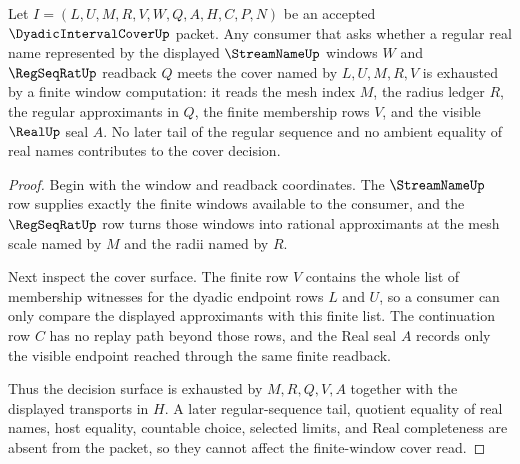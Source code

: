 \begin{theorem}
\label{thm:dyadic-interval-cover-regular-sequence-window-exhaustion}
Let $I=(L,U,M,R,V,W,Q,A,H,C,P,N)$ be an accepted $\DyadicIntervalCoverUp$ packet. Any consumer that asks whether a regular real name represented by the displayed $\StreamNameUp$ windows $W$ and $\RegSeqRatUp$ readback $Q$ meets the cover named by $L,U,M,R,V$ is exhausted by a finite window computation: it reads the mesh index $M$, the radius ledger $R$, the regular approximants in $Q$, the finite membership rows $V$, and the visible $\RealUp$ seal $A$. No later tail of the regular sequence and no ambient equality of real names contributes to the cover decision.
\end{theorem}
\begin{proof}
Begin with the window and readback coordinates. The $\StreamNameUp$ row supplies exactly the finite windows available to the consumer, and the $\RegSeqRatUp$ row turns those windows into rational approximants at the mesh scale named by $M$ and the radii named by $R$.

Next inspect the cover surface. The finite row $V$ contains the whole list of membership witnesses for the dyadic endpoint rows $L$ and $U$, so a consumer can only compare the displayed approximants with this finite list. The continuation row $C$ has no replay path beyond those rows, and the Real seal $A$ records only the visible endpoint reached through the same finite readback.

Thus the decision surface is exhausted by $M,R,Q,V,A$ together with the displayed transports in $H$. A later regular-sequence tail, quotient equality of real names, host equality, countable choice, selected limits, and Real completeness are absent from the packet, so they cannot affect the finite-window cover read.
\end{proof}

